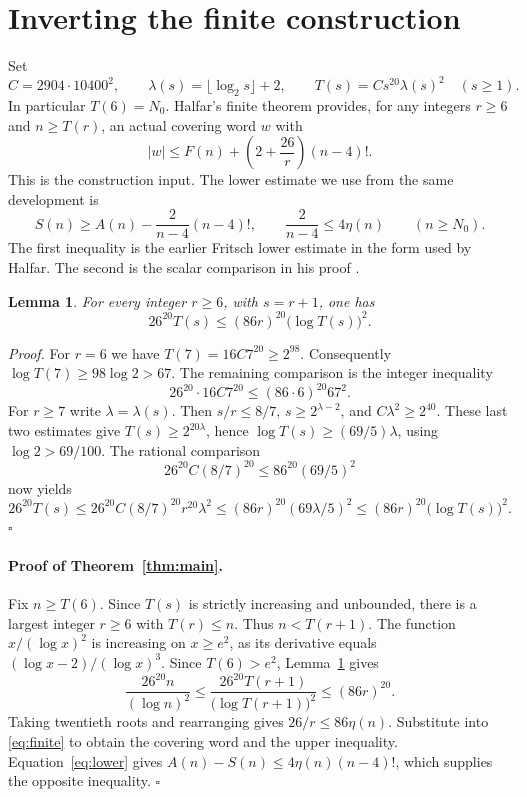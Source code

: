 \documentclass[11pt]{article}
\newtheorem{lemma}[theorem]{Lemma}
\newenvironment{proof}{\par\noindent\textit{Proof.}\enspace}{\unskip\nobreak\hfill\ensuremath{\square}\par}
\begin{document}
\section{Inverting the finite construction}
Set
\[
 C=2904\cdot10400^2,\qquad
 \lambda(s)=\lfloor\log_2 s\rfloor+2,\qquad
 T(s)=C s^{20}\lambda(s)^2\quad(s\ge1).
\]
In particular \(T(6)=N_0\). Halfar's finite theorem provides, for any integers \(r\ge6\) and \(n\ge T(r)\), an actual covering word \(w\) with
\begin{equation}\label{eq:finite}
       |w|\le F(n)+\left(2+\frac{26}{r}\right)(n-4)! .
\end{equation}
This is the construction input. The lower estimate we use from the same development is
\begin{equation}\label{eq:lower}
 S(n)\ge A(n)-\frac{2}{n-4}(n-4)!,\qquad
 \frac{2}{n-4}\le4\eta(n)\qquad(n\ge N_0).
\end{equation}
The first inequality is the earlier Fritsch lower estimate in the form used by Halfar. The second is the scalar comparison in his proof \cite{formal}.

\begin{lemma}\label{lem:end}
For every integer \(r\ge6\), with \(s=r+1\), one has
\begin{equation}\label{eq:cert}
                 26^{20}T(s)\le(86r)^{20}\bigl(\log T(s)\bigr)^2 .
\end{equation}
\end{lemma}

\begin{proof}
For \(r=6\) we have \(T(7)=16C7^{20}\ge2^{98}\).
Consequently \(\log T(7)\ge98\log 2>67\). The remaining comparison is the integer inequality
\[
                 26^{20}\cdot16C7^{20}\le(86\cdot6)^{20}67^2.
\]
For \(r\ge7\) write \(\lambda=\lambda(s)\). Then \(s/r\le8/7\), \(s\ge2^{\lambda-2}\), and \(C\lambda^2\ge2^{40}\). These last two estimates give \(T(s)\ge2^{20\lambda}\), hence \(\log T(s)\ge(69/5)\lambda\), using \(\log 2>69/100\). The rational comparison
\[
                 26^{20}C(8/7)^{20}\le86^{20}(69/5)^2
\]
now yields
\[
26^{20}T(s)\le 26^{20}C(8/7)^{20}r^{20}\lambda^2
    \le(86r)^{20}(69\lambda/5)^2
    \le(86r)^{20}\bigl(\log T(s)\bigr)^2 .
\]
\end{proof}

\paragraph{Proof of Theorem~\ref{thm:main}.}
Fix \(n\ge T(6)\). Since \(T(s)\) is strictly increasing and unbounded, there is a largest integer \(r\ge6\) with \(T(r)\le n\). Thus \(n<T(r+1)\). The function \(x/(\log x)^2\) is increasing on \(x\ge e^2\), as its derivative equals \((\log x-2)/(\log x)^3\). Since \(T(6)>e^2\), Lemma~\ref{lem:end} gives
\[
 \frac{26^{20}n}{(\log n)^2}
   \le \frac{26^{20}T(r+1)}{\bigl(\log T(r+1)\bigr)^2}
   \le (86r)^{20}.
\]
Taking twentieth roots and rearranging gives \(26/r\le86\eta(n)\). Substitute into \eqref{eq:finite} to obtain the covering word and the upper inequality. Equation~\eqref{eq:lower} gives \(A(n)-S(n)\le4\eta(n)(n-4)!\), which supplies the opposite inequality. \hfill\(\square\)
\end{document}

